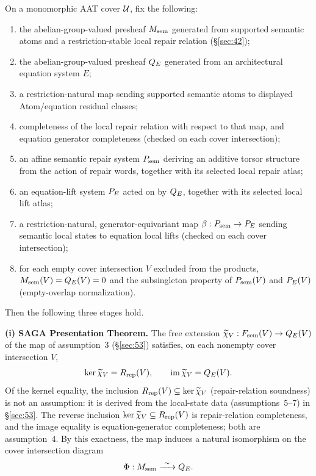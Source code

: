 \begin{theorem}\label{thm:central}
On a monomorphic AAT cover $\mathcal{U}$, fix the following:
\begin{enumerate}
\item the abelian-group-valued presheaf $M_{\mathrm{sem}}$ generated from
supported semantic atoms and a restriction-stable local repair relation
(\S\ref{sec:42});
\item the abelian-group-valued presheaf $Q_{E}$ generated from an
architectural equation system $E$;
\item a restriction-natural map sending supported semantic atoms to
displayed Atom/equation residual classes;
\item completeness of the local repair relation with respect to that
map, and equation generator completeness (checked on each cover
intersection);
\item an affine semantic repair system $P_{\mathrm{sem}}$ deriving an additive
torsor structure from the action of repair words, together with its
selected local repair atlas;
\item an equation-lift system $P_{E}$ acted on by $Q_{E}$, together with
its selected local lift atlas;
\item a restriction-natural, generator-equivariant map
$\beta:P_{\mathrm{sem}}\to P_{E}$ sending semantic local states to equation local
lifts (checked on each cover intersection);
\item for each empty cover intersection $V$ excluded from the products,
$M_{\mathrm{sem}}(V)=Q_{E}(V)=0$ and the subsingleton property of $P_{\mathrm{sem}}(V)$ and
$P_{E}(V)$ (empty-overlap normalization).
\end{enumerate}
Then the following three stages hold.

\textbf{(i) SAGA Presentation Theorem.} The free extension
$\widetilde\chi_V:F_{\mathrm{sem}}(V)\to Q_{E}(V)$ of the map of assumption~3
(\S\ref{sec:53}) satisfies, on each nonempty cover intersection $V$,
\[
\ker \widetilde\chi_V=R_{\mathrm{rep}}(V),
\qquad
\operatorname{im}\widetilde\chi_V=Q_{E}(V).
\]
Of the kernel equality, the inclusion
$R_{\mathrm{rep}}(V)\subseteq\ker\widetilde\chi_V$ (repair-relation soundness) is
not an assumption: it is derived from the local-state data
(assumptions~5--7) in \S\ref{sec:53}. The reverse inclusion
$\ker\widetilde\chi_V\subseteq R_{\mathrm{rep}}(V)$ is repair-relation
completeness, and the image equality is equation-generator
completeness; both are assumption~4. By this exactness, the map induces
a natural isomorphism on the cover intersection diagram
\[
\Phi:M_{\mathrm{sem}}\xrightarrow{\ \sim\ }Q_{E}.
\]


\end{theorem}
